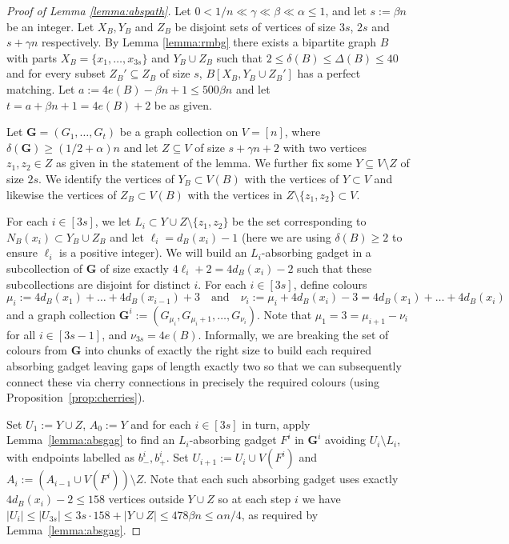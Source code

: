 \documentclass[10pt,a4paper]{amsart}
\newtheorem{linenomath}{Linenomath}
\newcommand{\aA}{\alpha}
\newcommand{\bB}{\beta}
\newcommand{\dD}{\delta}
\newcommand{\gG}{\gamma}
\newcommand{\mbf}[1]{\mathbf{#1}}
\newcommand{\sm}{\setminus}
\begin{document}
\begin{proof}[Proof of Lemma \ref{lemma:abspath}]
Let $0<1/n \ll \gG \ll \bB \ll \aA \leq 1$, and let $s:=\beta n$ be an integer. 
Let $X_B,Y_B$ and $ Z_B$ be disjoint sets of vertices of size $3s$, $2s$ and $s + \gG  n$ respectively. 
By Lemma \ref{lemma:rmbg} there exists a bipartite graph $B$ with parts $X_B=\{x_1, \ldots, x_{3s}\}$ and $Y_B \cup  Z_B$ such that $2 \leq \dD(B) \leq \Delta(B) \leq 40$ and for every subset $Z_B' \subseteq  Z_B$ of size $s$, $B[X_B, Y_B \cup Z_B']$ has a perfect matching. 
Let $a := 4e(B)-\bB n + 1 \leq 500 \bB n$ and let $t = a+\beta n+1= 4e(B)+2$ be as given.

Let $\mbf G = (G_1,\ldots,G_t)$ be a graph collection on $V=[n]$, where $\dD(\mbf {G}) \geq (1/2+\aA)n$ and let $Z \subseteq V$ of size $s+\gG n+2$ with two vertices $z_1,z_2\in Z$ as given in the statement of the lemma.  We further fix some  $Y \subseteq V \sm Z$ of size $2s$.
We identify the  vertices of $Y_B\subset V(B)$ with the vertices of $Y\subset V$ and likewise the vertices of $Z_B\subset V(B)$ with the vertices in $Z\sm \{z_1,z_2\}\subset V$.

For each $i \in [3s]$, we let $L_i\subset Y\cup Z\setminus \{z_1,z_2\}$ be the set corresponding to $N_B(x_i)\subset Y_B\cup Z_B$ and let $\ell_i=d_B(x_i)-1$ (here we are using $\delta(B)\ge 2$ to ensure $\ell_i$ is a positive integer).  We will build an $L_i$-absorbing gadget in a subcollection of $\mbf{G}$ of size exactly $4\ell_i+2=4d_B(x_i)-2$ such that these subcollections are disjoint for distinct $i$. 
For each $i \in [3s]$, define colours
\begin{equation*}
\mu_i := 4d_B(x_1)+\ldots+4d_B(x_{i-1})+3 
\quad\text{and}\quad
\nu_i := \mu_i + 4d_B(x_i)-3 = 4d_B(x_1)+\ldots + 4d_B(x_i)
 \end{equation*} 
and a graph collection $\mbf G^i := (G_{\mu_i},G_{\mu_i+1},\ldots,G_{\nu_i})$.
Note that $\mu_1=3=\mu_{i+1}-\nu_i$ for all $i \in [3s-1]$, and $\nu_{3s}=4e(B)$.
Informally, we are breaking the set of colours from $\mbf G$ into chunks of exactly the right size to build each required absorbing gadget leaving gaps of length exactly two so that we can subsequently connect these via cherry connections in precisely the required colours (using Proposition~\ref{prop:cherries}).

Set $U_1:=Y\cup Z$, $A_0:=Y$ and for each $i\in [3s]$ in turn, apply Lemma~\ref{lemma:absgag} to find an $L_i$-absorbing gadget $F^i$ in $\mbf G^i$ avoiding $U_i\setminus L_i$,  with endpoints labelled as $b^i_-,b^i_{+}$.
Set $U_{i+1}:=U_i\cup V(F^i)$ and $A_i:=(A_{i-1}\cup V(F^i))\sm Z$. 
Note that each such absorbing gadget uses exactly $4 d_B(x_i)-2\le 158$ vertices outside $Y \cup Z$ so at each step $i$ we have $|U_i|\le |U_{3s}|\le  3s\cdot 158+|Y\cup Z|\le 478\beta n \leq \alpha n/4$, as required by Lemma~\ref{lemma:absgag}.



\end{proof}
\end{document}
